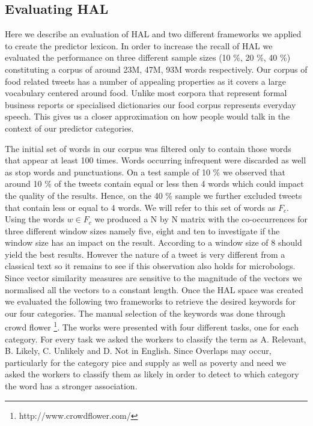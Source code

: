 \subsection{Evaluating HAL}

Here we describe an evaluation of HAL and two different frameworks we applied to create the predictor lexicon. In order to increase the recall of HAL we evaluated the performance on three different sample sizes (10 \%, 20 \%, 40 \%) constituting a corpus of around 23M, 47M, 93M words respectively. Our corpus of food related tweets has a number of appealing properties as it covers a large vocabulary centered around food. Unlike most corpora that represent formal business reports or specialised dictionaries our food corpus represents everyday speech. This gives us a closer approximation on how people would talk in the context of our predictor categories. 

The initial set of words in our corpus was filtered only to contain those words that appear at least 100 times. Words occurring infrequent were discarded as well as stop words and punctuations. On a test sample of 10 \% we observed that around 10 \% of the tweets contain equal or less then 4 words which could impact the quality of the results. Hence, on the 40 \% sample we further excluded tweets that contain less or equal to 4 words. We will refer to this set of words as $F_c$. Using the words $w \in F_c$ we produced a N by N matrix with the co-occurrences for three different window sizes namely five, eight and ten to investigate if the window size has an impact on the result. According to \cite{lund96} a window size of 8 should yield the best results. However the nature of a tweet is very different from a classical text so it remains to see if this observation also holds for microbologs. Since vector similarity measures are sensitive to the magnitude of the vectors we normalised all the vectors to a constant length. Once the HAL space was created we evaluated the following two frameworks to retrieve the desired keywords for our four categories. The manual selection of the keywords was done through crowd flower \footnote{http://www.crowdflower.com/}. The works were presented with four different tasks, one for each category. For every task we asked the workers to classify the term as A. Relevant, B. Likely, C. Unlikely and D. Not in English. Since Overlaps may occur, particularly for the category pice and supply as well as poverty and need we asked the workers to classify them as likely in order to detect to which category the word has a stronger association. 

